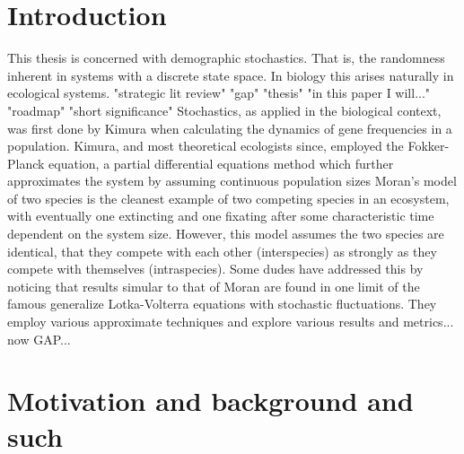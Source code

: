\documentclass[a4paper,11pt]{article}
\numberwithin{equation}{section} %
\begin{document}
\fi


\section{Introduction}

This thesis is concerned with demographic stochastics. That is, the randomness inherent in systems with a discrete state space. 
In biology this arises naturally in ecological systems. 
"strategic lit review"
"gap"
"thesis" "in this paper I will..."
"roadmap"
"short significance"
Stochastics, as applied in the biological context, was first done by Kimura when calculating the dynamics of gene frequencies in a population. %
Kimura, and most theoretical ecologists since, employed the Fokker-Planck equation, a partial differential equations method which further approximates the system by assuming continuous population sizes %
Moran's model of two species is the cleanest example of two competing species in an ecosystem, with eventually one extincting and one fixating after some characteristic time dependent on the system size. 
However, this model assumes the two species are identical, that they compete with each other (interspecies) as strongly as they compete with themselves (intraspecies). 
Some dudes have addressed this by noticing that results simular to that of Moran are found in one limit of the famous generalize Lotka-Volterra equations with stochastic fluctuations. 
They employ various approximate techniques and explore various results and metrics...
now GAP...



\section{Motivation and background and such}
\end{document}
